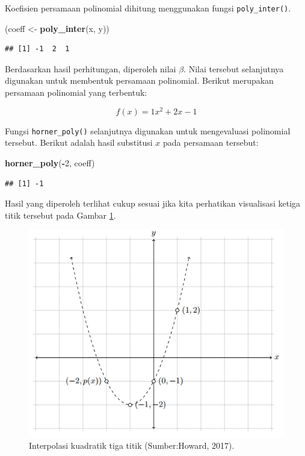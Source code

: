 \documentclass[]{book}
\newenvironment{Shaded}{\begin{snugshade}}{\end{snugshade}}
\newcommand{\DecValTok}[1]{\textcolor[rgb]{0.00,0.00,0.81}{#1}}
\newcommand{\KeywordTok}[1]{\textcolor[rgb]{0.13,0.29,0.53}{\textbf{#1}}}
\newcommand{\NormalTok}[1]{#1}
\newcommand{\OperatorTok}[1]{\textcolor[rgb]{0.81,0.36,0.00}{\textbf{#1}}}
\newcommand{\StringTok}[1]{\textcolor[rgb]{0.31,0.60,0.02}{#1}}
\theoremstyle{definition}
\theoremstyle{definition}
\theoremstyle{definition}
\theoremstyle{remark}
\begin{document}
Koefisien persamaan polinomial dihitung menggunakan fungsi \texttt{poly\_inter()}.

\begin{Shaded}
\begin{Highlighting}[]
\NormalTok{(coeff <-}\StringTok{ }\KeywordTok{poly_inter}\NormalTok{(x, y))}
\end{Highlighting}
\end{Shaded}

\begin{verbatim}
## [1] -1  2  1
\end{verbatim}

Berdasarkan hasil perhitungan, diperoleh nilai \(\beta\). Nilai tersebut selanjutnya digunakan untuk membentuk persamaan polinomial. Berikut merupakan persamaan polinomial yang terbentuk:

\[
f\left(x\right)=1x^2+2x-1
\]

Fungsi \texttt{horner\_poly()} selanjutnya digunakan untuk mengevaluasi polinomial tersebut. Berikut adalah hasil substitusi \(x\) pada persamaan tersebut:

\begin{Shaded}
\begin{Highlighting}[]
\KeywordTok{horner_poly}\NormalTok{(}\OperatorTok{-}\DecValTok{2}\NormalTok{, coeff)}
\end{Highlighting}
\end{Shaded}

\begin{verbatim}
## [1] -1
\end{verbatim}

Hasil yang diperoleh terlihat cukup sesuai jika kita perhatikan visualisasi ketiga titik tersebut pada Gambar \ref{fig:hopoliviz}.

\begin{figure}

{\centering \includegraphics[width=0.8\linewidth]{./images/hopoliviz} 

}

\caption{Interpolasi kuadratik tiga titik 
(Sumber:Howard, 2017).}\label{fig:hopoliviz}
\end{figure}
\end{document}
